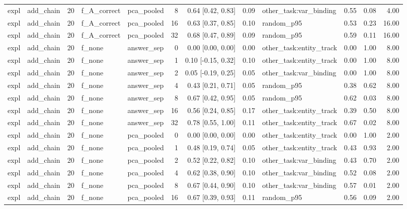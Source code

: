 \begin{tabular}{llrllrrrlrrr}
expl & add\_chain & 20 & f\_A\_correct & pca\_pooled & 8 & 0.64 [0.42, 0.83] & 0.09 & other\_task:var\_binding & 0.55 & 0.08 & 4.00 \\
expl & add\_chain & 20 & f\_A\_correct & pca\_pooled & 16 & 0.63 [0.37, 0.85] & 0.10 & random\_p95 & 0.53 & 0.23 & 16.00 \\
expl & add\_chain & 20 & f\_A\_correct & pca\_pooled & 32 & 0.68 [0.47, 0.89] & 0.09 & random\_p95 & 0.59 & 0.11 & 16.00 \\
expl & add\_chain & 20 & f\_none & answer\_sep & 0 & 0.00 [0.00, 0.00] & 0.00 & other\_task:entity\_track & 0.00 & 1.00 & 8.00 \\
expl & add\_chain & 20 & f\_none & answer\_sep & 1 & 0.10 [-0.15, 0.32] & 0.10 & other\_task:entity\_track & 0.00 & 1.00 & 8.00 \\
expl & add\_chain & 20 & f\_none & answer\_sep & 2 & 0.05 [-0.19, 0.25] & 0.05 & other\_task:var\_binding & 0.00 & 1.00 & 8.00 \\
expl & add\_chain & 20 & f\_none & answer\_sep & 4 & 0.43 [0.21, 0.71] & 0.05 & random\_p95 & 0.38 & 0.62 & 8.00 \\
expl & add\_chain & 20 & f\_none & answer\_sep & 8 & 0.67 [0.42, 0.95] & 0.05 & random\_p95 & 0.62 & 0.03 & 8.00 \\
expl & add\_chain & 20 & f\_none & answer\_sep & 16 & 0.56 [0.24, 0.85] & 0.17 & other\_task:entity\_track & 0.39 & 0.50 & 8.00 \\
expl & add\_chain & 20 & f\_none & answer\_sep & 32 & 0.78 [0.55, 1.00] & 0.11 & other\_task:entity\_track & 0.67 & 0.02 & 8.00 \\
expl & add\_chain & 20 & f\_none & pca\_pooled & 0 & 0.00 [0.00, 0.00] & 0.00 & other\_task:entity\_track & 0.00 & 1.00 & 2.00 \\
expl & add\_chain & 20 & f\_none & pca\_pooled & 1 & 0.48 [0.19, 0.74] & 0.05 & other\_task:entity\_track & 0.43 & 0.93 & 2.00 \\
expl & add\_chain & 20 & f\_none & pca\_pooled & 2 & 0.52 [0.22, 0.82] & 0.10 & other\_task:var\_binding & 0.43 & 0.70 & 2.00 \\
expl & add\_chain & 20 & f\_none & pca\_pooled & 4 & 0.62 [0.38, 0.90] & 0.10 & other\_task:var\_binding & 0.52 & 0.08 & 2.00 \\
expl & add\_chain & 20 & f\_none & pca\_pooled & 8 & 0.67 [0.44, 0.90] & 0.10 & other\_task:var\_binding & 0.57 & 0.01 & 2.00 \\
expl & add\_chain & 20 & f\_none & pca\_pooled & 16 & 0.67 [0.39, 0.93] & 0.11 & random\_p95 & 0.56 & 0.09 & 2.00 \\

\end{tabular}
